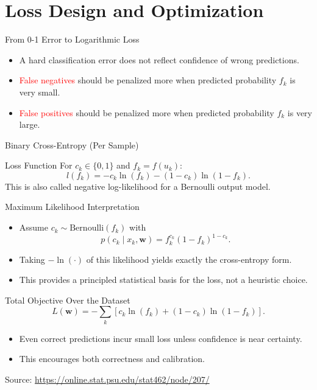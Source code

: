 \documentclass[10pt]{beamer}
\begin{document}
\section{Loss Design and Optimization}

\begin{frame}{From 0-1 Error to Logarithmic Loss}
  \justifying
  \begin{itemize}
    \item A hard classification error does not reflect confidence of wrong predictions.
    \item \textcolor{red}{False negatives} should be penalized more when predicted probability $f_k$ is very small.
    \item \textcolor{red}{False positives} should be penalized more when predicted probability $f_k$ is very large.
  \end{itemize}
\end{frame}

\begin{frame}{Binary Cross-Entropy (Per Sample)}
  \justifying
  \begin{conceptbox}{Loss Function}
    For $c_k\in\{0,1\}$ and $f_k=f(u_k)$:
    \[
      l(f_k)=-c_k\ln(f_k)-(1-c_k)\ln(1-f_k).
    \]
    This is also called negative log-likelihood for a Bernoulli output model.
  \end{conceptbox}
\end{frame}

\begin{frame}{Maximum Likelihood Interpretation}
  \justifying
  \begin{itemize}
    \item Assume $c_k\sim\mathrm{Bernoulli}(f_k)$ with
      \[
        p(c_k\mid x_k,\bm{w})=f_k^{c_k}(1-f_k)^{1-c_k}.
      \]
    \item Taking $-\ln(\cdot)$ of this likelihood yields exactly the cross-entropy form.
    \item This provides a principled statistical basis for the loss, not a heuristic choice.
  \end{itemize}
\end{frame}

\begin{frame}{Total Objective Over the Dataset}
  \justifying
  \begin{equation*}
    L(\bm{w}) = -\sum_k\left[c_k\ln(f_k)+(1-c_k)\ln(1-f_k)\right].
  \end{equation*}
  \begin{itemize}
    \item Even correct predictions incur small loss unless confidence is near certainty.
    \item This encourages both correctness and calibration.
  \end{itemize}
  \vspace{0.5em}
  {\footnotesize Source: \url{https://online.stat.psu.edu/stat462/node/207/}}
\end{frame}
\end{document}
